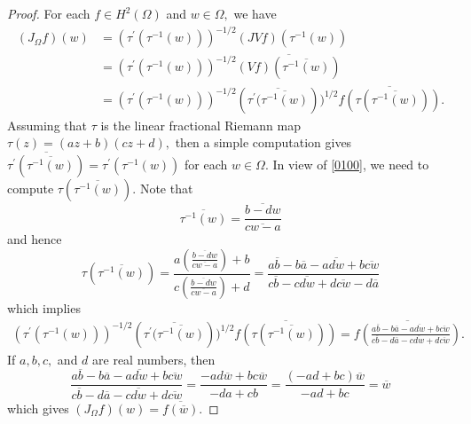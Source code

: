 \documentclass[11pt]{amsart}%
\newtheorem{cor}[thm]{Corollary}
\theoremstyle{definition}
\theoremstyle{remark}
\numberwithin{equation}{section}
\begin{document}
\begin{proof}
For each $f\in H^{2}(\Omega)$ and $w\in\Omega,$ we have
\begin{align}
(J_{\Omega}f)(w)  &  =(\tau^{\prime}(\tau^{-1}(w)))^{-1/2}(JVf)(\tau
^{-1}(w))\nonumber\label{0100}\\
&  =(\tau^{\prime}(\tau^{-1}(w)))^{-1/2}\overline{(Vf)(\overline{\tau^{-1}%
(w)})}\nonumber\\
&  =(\tau^{\prime}(\tau^{-1}(w)))^{-1/2}(\overline{\tau^{\prime}%
(\overline{\tau^{-1}(w)}}))^{1/2}\overline{f(\tau(\overline{\tau^{-1}(w)}))}.
\end{align}
Assuming that $\tau$ is the linear fractional Riemann map $\tau
(z)=(az+b)(cz+d),$ then a simple computation gives $\overline{\tau^{\prime
}(\overline{\tau^{-1}(w)})}=\tau^{\prime}(\tau^{-1}(w))$ for each $w\in\Omega.$ In
view of \eqref{0100}, we need to compute $\tau(\overline{\tau^{-1}(w)}).$ Note
that
\[
\overline{\tau^{-1}(w)}=\frac{\overline{b-dw}}{\overline{cw-a}}%
\]
and hence
\[
\tau(\overline{\tau^{-1}(w)})=\frac{a\left(  \frac{\overline{b-dw}}%
{\overline{cw-a}}\right)  +b}{c\left(  \frac{\overline{b-dw}}{\overline{cw-a}%
}\right)  +d}=\frac{a\overline{b}-b\overline{a}-a\overline{dw}+b\overline{cw}%
}{c\overline{b}-c\overline{dw}+d\overline{cw}-d\overline{a}}%
\]
which implies
\begin{align}
(\tau^{\prime}(\tau^{-1}(w)))^{-1/2}(\overline{\tau^{\prime}(\overline
{\tau^{-1}(w)}}))^{1/2}\overline{f(\tau(\overline{\tau^{-1}(w)}))}%
=\overline{f\left(  \frac{a\overline{b}-b\overline{a}-a\overline
{dw}+b\overline{cw}}{c\overline{b}-d\overline{a}-c\overline{dw}+d\overline
{cw}}\right)  }.
\end{align}
If $a,b,c,$ and $d$ are real numbers, then
\[
\frac{a\overline{b}-b\overline{a}-a\overline{dw}+b\overline{cw}}{c\overline
{b}-d\overline{a}-c\overline{dw}+d\overline{cw}}=\frac{-ad\overline
{w}+bc\overline{w}}{-da+cb}=\frac{(-ad+bc)\overline{w}}{-ad+bc}=\overline{w}%
\]
which gives $(J_{\Omega}f)(w)=\overline{f(\overline{w})}.$
\end{proof}



\end{document}
